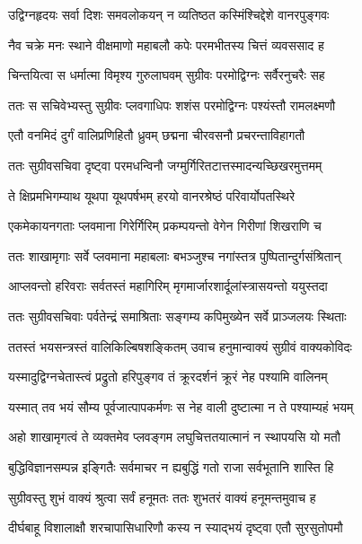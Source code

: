\twolineshloka
{उद्विग्नहृदयः सर्वा दिशः समवलोकयन्}
{न व्यतिष्ठत कस्मिंश्चिद्देशे वानरपुङ्गवः} %

\twolineshloka
{नैव चक्रे मनः स्थाने वीक्षमाणो महाबलौ}
{कपेः परमभीतस्य चित्तं व्यवससाद ह} %

\twolineshloka
{चिन्तयित्वा स धर्मात्मा विमृश्य गुरुलाघवम्}
{सुग्रीवः परमोद्विग्नः सर्वैरनुचरैः सह} %

\twolineshloka
{ततः स सचिवेभ्यस्तु सुग्रीवः प्लवगाधिपः}
{शशंस परमोद्विग्नः पश्यंस्तौ रामलक्ष्मणौ} %

\twolineshloka
{एतौ वनमिदं दुर्गं वालिप्रणिहितौ ध्रुवम्}
{छद्मना चीरवसनौ प्रचरन्ताविहागतौ} %

\twolineshloka
{ततः सुग्रीवसचिवा दृष्ट्वा परमधन्विनौ}
{जग्मुर्गिरितटात्तस्मादन्यच्छिखरमुत्तमम्} %

\twolineshloka
{ते क्षिप्रमभिगम्याथ यूथपा यूथपर्षभम्}
{हरयो वानरश्रेष्ठं परिवार्योपतस्थिरे} %

\twolineshloka
{एकमेकायनगताः प्लवमाना गिरेर्गिरिम्}
{प्रकम्पयन्तो वेगेन गिरीणां शिखराणि च} %

\twolineshloka
{ततः शाखामृगाः सर्वे प्लवमाना महाबलाः}
{बभञ्जुश्च नगांस्तत्र पुष्पितान्दुर्गसंश्रितान्} %

\twolineshloka
{आप्लवन्तो हरिवराः सर्वतस्तं महागिरिम्}
{मृगमार्जारशार्दूलांस्त्रासयन्तो ययुस्तदा} %

\twolineshloka
{ततः सुग्रीवसचिवाः पर्वतेन्द्रं समाश्रिताः}
{सङ्गम्य कपिमुख्येन सर्वे प्राञ्जलयः स्थिताः} %

\twolineshloka
{ततस्तं भयसन्त्रस्तं वालिकिल्बिषशङ्कितम्}
{उवाच हनुमान्वाक्यं सुग्रीवं वाक्यकोविदः} %

\twolineshloka
{यस्मादुद्विग्नचेतास्त्वं प्रद्रुतो हरिपुङ्गव}
{तं क्रूरदर्शनं क्रूरं नेह पश्यामि वालिनम्} %

\twolineshloka
{यस्मात् तव भयं सौम्य पूर्वजात्पापकर्मणः}
{स नेह वाली दुष्टात्मा न ते पश्याम्यहं भयम्} %

\twolineshloka
{अहो शाखामृगत्वं ते व्यक्तमेव प्लवङ्गम}
{लघुचित्ततयात्मानं न स्थापयसि यो मतौ} %

\twolineshloka
{बुद्धिविज्ञानसम्पन्न इङ्गितैः सर्वमाचर}
{न ह्यबुद्धिं गतो राजा सर्वभूतानि शास्ति हि} %

\twolineshloka
{सुग्रीवस्तु शुभं वाक्यं श्रुत्वा सर्वं हनूमतः}
{ततः शुभतरं वाक्यं हनूमन्तमुवाच ह} %

\twolineshloka
{दीर्घबाहू विशालाक्षौ शरचापासिधारिणौ}
{कस्य न स्याद्भयं दृष्ट्वा एतौ सुरसुतोपमौ} %


